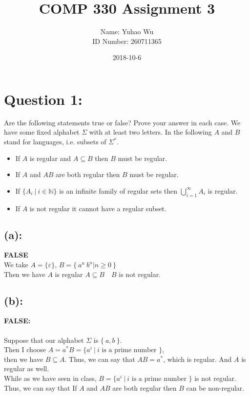 \documentclass [9 pt]{article}
\theoremstyle{definition}
\begin{document}
\title{COMP 330 Assignment 3}
\date{2018-10-6}
\author{Name: Yuhao Wu\\
ID Number: 260711365
}
\maketitle


\section*{Question 1:}
Are the following statements true or false? Prove your answer in each case. We have some fixed alphabet $\Sigma$ with at least two letters. In the following $A$ and $B$ stand for languages, i.e. subsets of $\Sigma^*$.
\begin{itemize}
	\item If $A$ is regular and $A \subseteq B$ then $B$ must be regular. 
	\item If $A$ and $AB$ are both regular then $B$ must be regular. 
	\item  If $\{A_i\ |\ i   \in \mathbb{N}  \} $ is an infinite family of regular sets then $ \bigcup_{i = 1}^{\infty} A_i$ is regular. 
	\item  If $A$ is not regular it cannot have a regular subset.
\end{itemize}


\subsection*{(a):}
\textbf{FALSE}\\
\newline
We take $A = \{ \varepsilon \}$, $B = \{\  a^n \ b^n | n \geq 0\  \}$\\
\newline
Then we have $A$ is regular \quad $A \subseteq B \quad B $ is not regular.

\subsection*{(b):}
\textbf{FALSE:}\\
\\
Suppose that our alphabet $\Sigma$ is $\{\ a, b \ \}$.\\
Then I choose $A = a^*$\quad \quad $B = \{ a^i\ |\ i\text{  is a prime number } \}$,\\
 then we have $B\subseteq A$. Thus, we can say that $AB = a^*$, which is regular.
 And $A$ is regular as well.\\
 While as we have seen in class, $B = \{ a^i\ |\ i\text{  is a prime number } \}$ is not regular.\\
 Thus, we can say that If $A$ and $AB$ are both regular then $B$ can be non-regular. 
\end{document}
